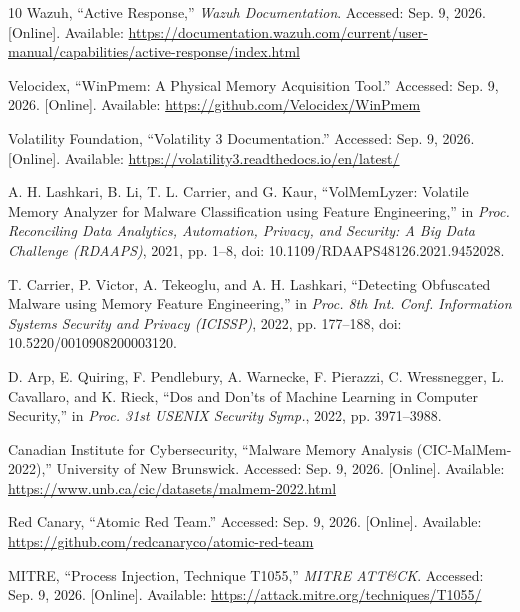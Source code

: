 \documentclass[conference]{IEEEtran}
\begin{document}
\begin{thebibliography}{10}
 Wazuh, ``Active Response,'' \textit{Wazuh Documentation}.
Accessed: Sep. 9, 2026. [Online]. Available:
\url{https://documentation.wazuh.com/current/user-manual/capabilities/active-response/index.html}

 Velocidex, ``WinPmem: A Physical Memory Acquisition Tool.''
Accessed: Sep. 9, 2026. [Online]. Available:
\url{https://github.com/Velocidex/WinPmem}

 Volatility Foundation, ``Volatility 3 Documentation.''
Accessed: Sep. 9, 2026. [Online]. Available:
\url{https://volatility3.readthedocs.io/en/latest/}

 A. H. Lashkari, B. Li, T. L. Carrier, and G. Kaur,
``VolMemLyzer: Volatile Memory Analyzer for Malware Classification using
Feature Engineering,'' in \textit{Proc. Reconciling Data Analytics,
Automation, Privacy, and Security: A Big Data Challenge (RDAAPS)},
2021, pp. 1--8, doi: 10.1109/RDAAPS48126.2021.9452028.

 T. Carrier, P. Victor, A. Tekeoglu, and A. H. Lashkari,
``Detecting Obfuscated Malware using Memory Feature Engineering,'' in
\textit{Proc. 8th Int. Conf. Information Systems Security and Privacy
(ICISSP)}, 2022, pp. 177--188, doi: 10.5220/0010908200003120.

 D. Arp, E. Quiring, F. Pendlebury, A. Warnecke,
F. Pierazzi, C. Wressnegger, L. Cavallaro, and K. Rieck,
``Dos and Don'ts of Machine Learning in Computer Security,'' in
\textit{Proc. 31st USENIX Security Symp.}, 2022, pp. 3971--3988.

 Canadian Institute for Cybersecurity,
``Malware Memory Analysis (CIC-MalMem-2022),'' University of New Brunswick.
Accessed: Sep. 9, 2026. [Online]. Available:
\url{https://www.unb.ca/cic/datasets/malmem-2022.html}

 Red Canary, ``Atomic Red Team.''
Accessed: Sep. 9, 2026. [Online]. Available:
\url{https://github.com/redcanaryco/atomic-red-team}

 MITRE, ``Process Injection, Technique T1055,''
\textit{MITRE ATT\&CK}.
Accessed: Sep. 9, 2026. [Online]. Available:
\url{https://attack.mitre.org/techniques/T1055/}

\end{thebibliography}
\end{document}
